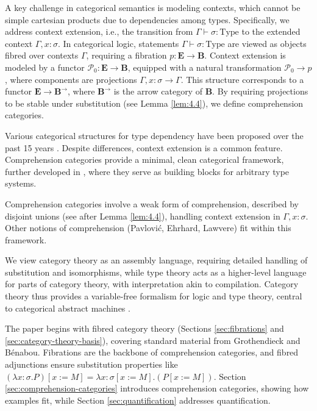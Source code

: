\documentclass{article}
\begin{document}
A key challenge in categorical semantics is modeling contexts, which cannot be simple cartesian products due to dependencies among types. Specifically, we address context extension, i.e., the transition from $\Gamma \vdash \sigma : \text{Type}$ to the extended context $\Gamma, x : \sigma$. In categorical logic, statements $\Gamma \vdash \sigma : \text{Type}$ are viewed as objects fibred over contexts $\Gamma$, requiring a fibration $p : \mathbf{E} \to \mathbf{B}$. Context extension is modeled by a functor $\mathscr{P}_0 : \mathbf{E} \to \mathbf{B}$, equipped with a natural transformation $\mathscr{P}_0 \to p$, where components are projections $\Gamma, x : \sigma \to \Gamma$. This structure corresponds to a functor $\mathbf{E} \to \mathbf{B}^{\to}$, where $\mathbf{B}^{\to}$ is the arrow category of $\mathbf{B}$. By requiring projections to be stable under substitution (see Lemma \ref{lem:4.4}), we define comprehension categories.

Various categorical structures for type dependency have been proposed over the past 15 years \cite{Cartmell1978, Seely1984, Taylor1986, Lamarche1988, HylandPitts1989, Moggi1991, Pavlovic1990}. Despite differences, context extension is a common feature. Comprehension categories provide a minimal, clean categorical framework, further developed in \cite{Jacobs1991, JacobsMoggiStreicher1991}, where they serve as building blocks for arbitrary type systems.

Comprehension categories involve a weak form of comprehension, described by disjoint unions (see after Lemma \ref{lem:4.4}), handling context extension in $\Gamma, x : \sigma$. Other notions of comprehension (Pavlović, Ehrhard, Lawvere) fit within this framework.

We view category theory as an assembly language, requiring detailed handling of substitution and isomorphisms, while type theory acts as a higher-level language for parts of category theory, with interpretation akin to compilation. Category theory thus provides a variable-free formalism for logic and type theory, central to categorical abstract machines \cite{Curien1986, Curien1989}.

The paper begins with fibred category theory (Sections \ref{sec:fibrations} and \ref{sec:category-theory-basis}), covering standard material from Grothendieck and Bénabou. Fibrations are the backbone of comprehension categories, and fibred adjunctions ensure substitution properties like $(\lambda x : \sigma . P)[x := M] = \lambda x : \sigma[x := M] . (P[x := M])$. Section \ref{sec:comprehension-categories} introduces comprehension categories, showing how examples fit, while Section \ref{sec:quantification} addresses quantification.
\end{document}

